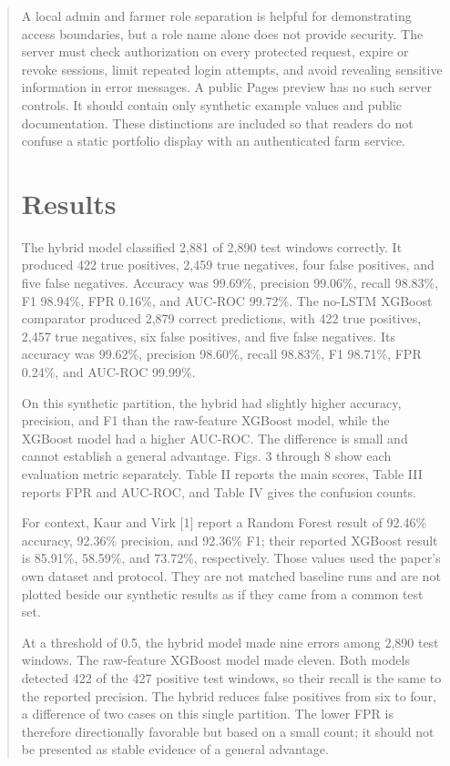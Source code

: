 \documentclass[journal]{IEEEtran}
\begin{document}
\begin{abstract}
A local admin and farmer role separation is helpful for demonstrating access boundaries, but a role name alone does not provide security. The server must check authorization on every protected request, expire or revoke sessions, limit repeated login attempts, and avoid revealing sensitive information in error messages. A public Pages preview has no such server controls. It should contain only synthetic example values and public documentation. These distinctions are included so that readers do not confuse a static portfolio display with an authenticated farm service.

\section{Results}

The hybrid model classified 2,881 of 2,890 test windows correctly. It produced 422 true positives, 2,459 true negatives, four false positives, and five false negatives. Accuracy was 99.69\%, precision 99.06\%, recall 98.83\%, F1 98.94\%, FPR 0.16\%, and AUC-ROC 99.72\%. The no-LSTM XGBoost comparator produced 2,879 correct predictions, with 422 true positives, 2,457 true negatives, six false positives, and five false negatives. Its accuracy was 99.62\%, precision 98.60\%, recall 98.83\%, F1 98.71\%, FPR 0.24\%, and AUC-ROC 99.99\%.

On this synthetic partition, the hybrid had slightly higher accuracy, precision, and F1 than the raw-feature XGBoost model, while the XGBoost model had a higher AUC-ROC. The difference is small and cannot establish a general advantage. Figs. 3 through 8 show each evaluation metric separately. Table II reports the main scores, Table III reports FPR and AUC-ROC, and Table IV gives the confusion counts.

For context, Kaur and Virk [1] report a Random Forest result of 92.46\% accuracy, 92.36\% precision, and 92.36\% F1; their reported XGBoost result is 85.91\%, 58.59\%, and 73.72\%, respectively. Those values used the paper's own dataset and protocol. They are not matched baseline runs and are not plotted beside our synthetic results as if they came from a common test set.

At a threshold of 0.5, the hybrid model made nine errors among 2,890 test windows. The raw-feature XGBoost model made eleven. Both models detected 422 of the 427 positive test windows, so their recall is the same to the reported precision. The hybrid reduces false positives from six to four, a difference of two cases on this single partition. The lower FPR is therefore directionally favorable but based on a small count; it should not be presented as stable evidence of a general advantage.


\end{abstract}
\end{document}
